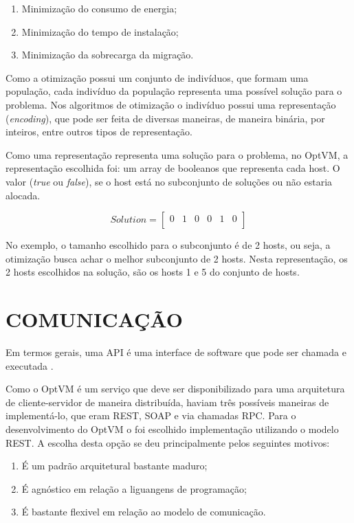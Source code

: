 \begin{enumerate}
\item Minimização do consumo de energia;
\item Minimização do tempo de instalação;
\item Minimização da sobrecarga da migração.
\end{enumerate}

Como a otimização possui um conjunto de indivíduos, que formam uma população, cada indivíduo
da população representa uma possível solução para o problema.  Nos algoritmos de 
otimização o indivíduo possui uma representação (\textit{encoding}), que pode ser feita
de diversas maneiras, de maneira binária, por inteiros, entre outros tipos de representação.

Como uma representação representa uma solução para o problema, no OptVM, a 
representação escolhida foi: um array de booleanos que representa cada host.
O valor (\textit{true} ou \textit{false}), se o host está no subconjunto de soluções 
ou não estaria alocada.

\[
  Solution=
  \left[{\begin{array}{cccccc}
    0 & 1 & 0 & 0 & 1 & 0 \\
  \end{array}}\right
  ]
\]

No exemplo, o tamanho escolhido para o subconjunto é de 2 hosts, ou seja, 
a otimização busca achar o melhor subconjunto de 2 hosts. Nesta representação,
os 2 hosts escolhidos na solução, são os hosts 1 e 5 do conjunto de hosts.

\section{COMUNICAÇÃO}
Em termos gerais, uma API é uma interface de software que pode ser chamada e executada \cite{eizinger}. 

Como o OptVM é um serviço que deve ser disponibilizado para uma arquitetura de 
cliente-servidor de maneira distribuída, haviam três possíveis maneiras de implementá-lo, 
que eram REST, SOAP e via chamadas RPC. 
Para o desenvolvimento do OptVM o foi escolhido implementação utilizando o modelo REST. 
A escolha desta opção se deu principalmente pelos seguintes motivos:

\begin{enumerate}
\item É um padrão arquitetural bastante maduro;
\item É agnóstico em relação a liguangens de programação;
\item É bastante flexivel em relação ao modelo de comunicação.
\end{enumerate}

